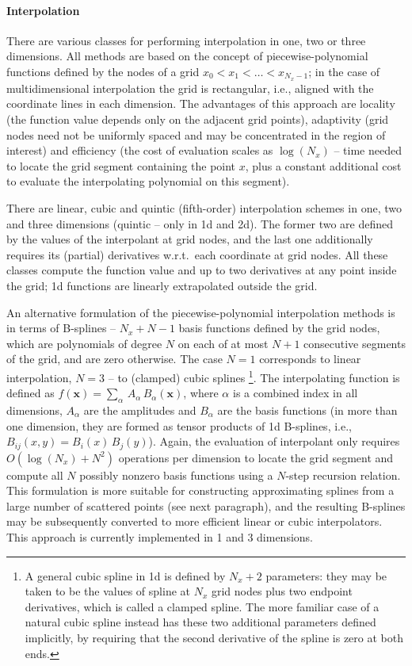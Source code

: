 \documentclass[12pt]{article}
\newcommand{\bx}{\boldsymbol{x}}
\begin{document}
\paragraph{Interpolation} \label{sec:SplineInterpolation}
There are various classes for performing interpolation in one, two or three dimensions.
All methods are based on the concept of piecewise-polynomial functions defined by the nodes of a grid $x_0<x_1<\dots<x_{N_x-1}$; in the case of multidimensional interpolation the grid is rectangular, i.e., aligned with the coordinate lines in each dimension. The advantages of this approach are locality (the function value depends only on the adjacent grid points), adaptivity (grid nodes need not be uniformly spaced and may be concentrated in the region of interest) and efficiency (the cost of evaluation scales as $\log(N_x)$ -- time needed to locate the grid segment containing the point $x$, plus a constant additional cost to evaluate the interpolating polynomial on this segment).

There are linear, cubic and quintic (fifth-order) interpolation schemes in one, two and three dimensions (quintic -- only in 1d and 2d). The former two are defined by the values of the interpolant at grid nodes, and the last one additionally requires its (partial) derivatives w.r.t.\ each coordinate at grid nodes. All these classes compute the function value and up to two derivatives at any point inside the grid; 1d functions are linearly extrapolated outside the grid.

An alternative formulation of the piecewise-polynomial interpolation methods is in terms of B-splines -- $N_x+N-1$ basis functions defined by the grid nodes, which are polynomials of degree $N$ on each of at most $N+1$ consecutive segments of the grid, and are zero otherwise. The case $N=1$ corresponds to linear interpolation, $N=3$ -- to (clamped) cubic splines%
\footnote{A general cubic spline in 1d is defined by $N_x+2$ parameters: they may be taken to be the values of spline at $N_x$ grid nodes plus two endpoint derivatives, which is called a clamped spline. The more familiar case of a natural cubic spline instead has these two additional parameters defined implicitly, by requiring that the second derivative of the spline is zero at both ends.}.
The interpolating function is defined as $f(\bx) = \sum_\alpha\,A_\alpha\,B_\alpha(\bx)$, where $\alpha$ is a combined index in all dimensions, $A_\alpha$ are the amplitudes and $B_\alpha$ are the basis functions (in more than one dimension, they are formed as tensor products of 1d B-splines, i.e., $B_{ij}(x,y) = B_i(x)\,B_j(y)$). Again, the evaluation of interpolant only requires $O(\log(N_x)+N^2)$ operations per dimension to locate the grid segment and compute all $N$ possibly nonzero basis functions using a $N$-step recursion relation. This formulation is more suitable for constructing approximating splines from a large number of scattered points (see next paragraph), and the resulting B-splines may be subsequently converted to more efficient linear or cubic interpolators. This approach is currently implemented in 1 and 3 dimensions.
\end{document}
